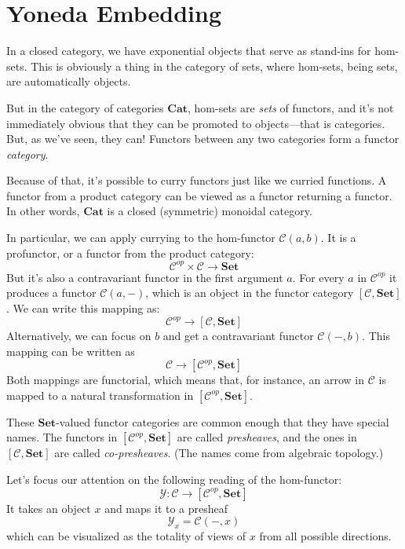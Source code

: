 \documentclass[DaoFP]{subfiles}
\begin{document}
\section{Yoneda Embedding}

In a closed category, we have exponential objects that serve as stand-ins for hom-sets. This is obviously a thing in the category of sets, where hom-sets, being sets, are automatically objects. 

But in the category of categories  $\mathbf{Cat}$, hom-sets are \emph{sets} of functors, and it's not immediately obvious that they can be promoted to objects---that is categories. But, as we've seen, they can! Functors between any two categories form a functor \emph{category}.

Because of that, it's possible to curry functors just like we curried functions. A functor from a product category can be viewed as a functor returning a functor. In other words, $\mathbf{Cat}$ is a closed (symmetric) monoidal category.

In particular, we can apply currying to the hom-functor $\mathcal{C}(a, b)$. It is a profunctor, or a functor from the product category:
\[ \mathcal{C}^{op} \times \mathcal{C} \to  \mathbf{Set} \]
But it's also a contravariant functor in the first argument $a$. For every $a$ in  $\mathcal{C}^{op}$  it produces a functor $\mathcal{C}(a, -)$, which is an object in the functor category $ [\mathcal{C},  \mathbf{Set}] $. We can write this mapping as:
\[ \mathcal{C}^{op} \to [\mathcal{C},  \mathbf{Set}] \]
Alternatively, we can focus on $b$ and get a contravariant functor $\mathcal{C}(-, b)$. This mapping can be written as
\[ \mathcal{C} \to [\mathcal{C}^{op},  \mathbf{Set}] \]
Both mappings are functorial, which means that, for instance, an arrow in $\mathcal{C}$ is mapped to a natural transformation in $[\mathcal{C}^{op},  \mathbf{Set}]$.

These $\mathbf{Set}$-valued functor categories are common enough that they have special names. The functors in $[\mathcal{C}^{op},  \mathbf{Set}]$ are called \emph{presheaves}, and the ones in $[\mathcal{C},  \mathbf{Set}]$ are called \emph{co-presheaves}. (The names come from algebraic topology.)

Let's focus our attention on the following reading of the hom-functor:
\[ \mathcal{Y} \colon \mathcal{C} \to [\mathcal{C}^{op},  \mathbf{Set}] \]
It takes an object $x$ and maps it to a presheaf 
\[ \mathcal Y_x = \mathcal{C}(-, x) \]
which can be visualized as the totality of views of $x$ from all possible directions.
\end{document}
